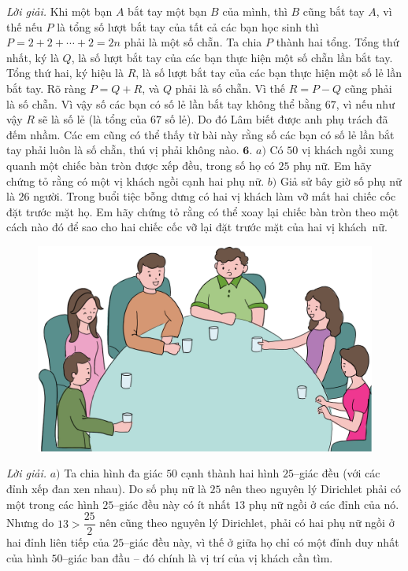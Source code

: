 \begin{multicols}{2}
\begin{figure}[H]
	\end{figure}
	\textit{Lời giải.} 	Khi một bạn $A$ bắt tay một bạn $B$ của mình, thì $B$ cũng bắt tay $A$, vì thế nếu $P$ là tổng số lượt bắt tay của tất cả các bạn học sinh thì $P= 2+2+\cdots+2=2n$ phải là một số chẵn.
	\vskip 0.1cm
	Ta chia $P$ thành hai tổng. Tổng thứ nhất, ký là $Q$, là số lượt bắt tay của các bạn thực hiện một số chẵn lần bắt tay. Tổng thứ hai, ký hiệu là $R$, là số lượt bắt tay của các bạn thực hiện một số lẻ lần bắt tay. Rõ ràng $P= Q+R$, và $Q$ phải là số chẵn. Vì thế $R = P - Q$ cũng phải là số chẵn. Vì vậy số các bạn có số lẻ lần bắt tay không thể bằng $67$, vì nếu như vậy $R$ sẽ là số lẻ (là tổng của $67$ số lẻ). Do đó Lâm biết được anh phụ trách đã đếm nhầm. Các em cũng có thể thấy từ bài này rằng số các bạn có số lẻ lần bắt tay phải luôn là số chẵn, thú vị phải không nào.
	\vskip 0.1cm
	$\pmb{6.}$ $a)$  Có $50$ vị khách ngồi xung quanh một chiếc bàn tròn được xếp đều, trong số họ có $25$ phụ nữ. Em hãy chứng tỏ rằng có một vị khách ngồi cạnh hai phụ nữ.
	\vskip 0.1cm
	$b)$ Giả sử bây giờ số phụ nữ là $26$ người. Trong buổi tiệc bỗng dưng có hai vị khách làm vỡ mất hai chiếc cốc đặt trước mặt họ. Em hãy chứng tỏ rằng có thể xoay lại chiếc bàn tròn theo một cách nào đó để sao cho hai chiếc cốc vỡ lại đặt trước mặt của hai vị khách~nữ.
	\begin{figure}[H]
		\centering
		\vspace*{-10pt}
		\captionsetup{labelformat= empty, justification=centering}
		\includegraphics[width=1\linewidth]{Pi10_ToanBi_Bai6}
		\vspace*{-10pt}
	\end{figure}
	\textit{Lời giải.} $a)$	Ta chia hình đa giác $50$ cạnh thành hai hình $25$--giác đều (với các đỉnh xếp đan xen nhau). Do số phụ nữ là $25$ nên theo nguyên lý Dirichlet phải có một trong các hình $25$--giác đều này có ít nhất $13$ phụ nữ ngồi ở các đỉnh của nó. Nhưng do $13>\dfrac{25}{2}$ nên cũng theo nguyên lý Dirichlet, phải có hai phụ nữ ngồi ở hai đỉnh liên tiếp của $25$--giác đều này, vì thế ở giữa họ chỉ có một đỉnh duy nhất của hình $50$--giác ban đầu -- đó chính là vị trí của vị khách cần tìm.

\end{multicols}
